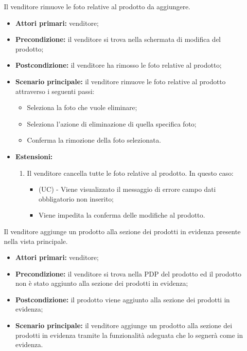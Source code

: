 Il venditore rimuove le foto relative al prodotto da aggiungere.
\begin{itemize}
    \item \textbf{Attori primari:} venditore;
    \item \textbf{Precondizione:} il venditore si trova nella schermata di modifica del prodotto;
    \item \textbf{Postcondizione:} il venditore ha rimosso le foto relative al prodotto;
    \item \textbf{Scenario principale:} il venditore rimuove le foto relative al prodotto attraverso i seguenti passi: 
    \begin{itemize}
        \item Seleziona la foto che vuole eliminare;
        \item Seleziona l'azione di eliminazione di quella specifica foto;
        \item Conferma la rimozione della foto selezionata.
    \end{itemize}
    \item \textbf{Estensioni:}
    \begin{enumerate}[label=\lett]
    	\item Il venditore cancella tutte le foto relative al prodotto. In questo caso:
    	\begin{itemize}
    		\item (UC) - Viene visualizzato il messaggio di errore campo dati obbligatorio non inserito;
    		\item Viene impedita la conferma delle modifiche al prodotto.
    	\end{itemize}
    \end{enumerate}
\end{itemize}

Il venditore aggiunge un prodotto alla sezione dei prodotti in evidenza presente nella vista principale.
\begin{itemize}
    \item \textbf{Attori primari:} venditore;
    \item \textbf{Precondizione:} il venditore si trova nella PDP del prodotto ed il prodotto non è stato aggiunto alla sezione dei prodotti in evidenza;
    \item \textbf{Postcondizione:} il prodotto viene aggiunto alla sezione dei prodotti in evidenza;
    \item \textbf{Scenario principale:} il venditore aggiunge un prodotto alla sezione dei prodotti in evidenza tramite la funzionalità adeguata che lo segnerà come in evidenza.
\end{itemize}

